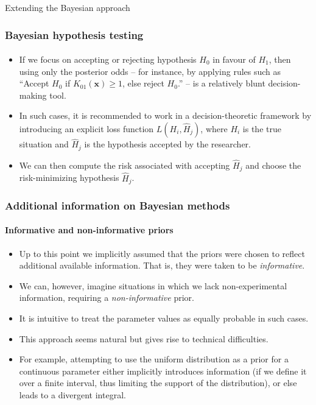 \documentclass[10pt]{beamer}
\theoremstyle{definition}
\begin{document}
\begin{section}{Extending the Bayesian approach}
\begin{frame}[fragile]
\frametitle{Bayesian hypothesis testing}
\framesubtitle{}
\begin{itemize}\itemsep1em
\item If we focus on accepting or rejecting hypothesis $H_0$ in favour of $H_1$, then using only the posterior odds -- for instance, by applying rules such as ``Accept $H_0$ if $K_{01}(\mathbf{x})\geq 1$, else reject $H_0$.'' -- is a relatively blunt decision-making tool.
\item In such cases, it is recommended to work in a decision-theoretic framework by introducing an explicit loss function $L(H_i,\hat{H}_j)$, where $H_i$ is the true situation and $\hat{H}_j$ is the hypothesis accepted by the researcher.
\item  We can then compute the risk associated with accepting  $\hat{H}_j$ and choose the risk-minimizing hypothesis $\hat{H}_j$.
\end{itemize}
\end{frame}

\begin{frame}[fragile]
\frametitle{Additional information on Bayesian methods}
\framesubtitle{Informative and non-informative priors}
\begin{itemize}\itemsep1em
\item Up to this point we implicitly assumed that the priors were chosen to reflect additional available information. That is, they were taken to be \emph{informative}.
\item We can, however, imagine situations in which we lack non-experimental information, requiring a \emph{non-informative} prior.
\item It is intuitive to treat the parameter values as equally probable in such cases.
\item This approach seems natural but gives rise to technical difficulties.
\item For example, attempting to use the uniform distribution as a prior for a continuous parameter either implicitly introduces information (if we define it over a finite interval, thus limiting the support of the distribution), or else leads to a divergent integral.
\end{itemize}
\end{frame}


\end{section}
\end{document}
